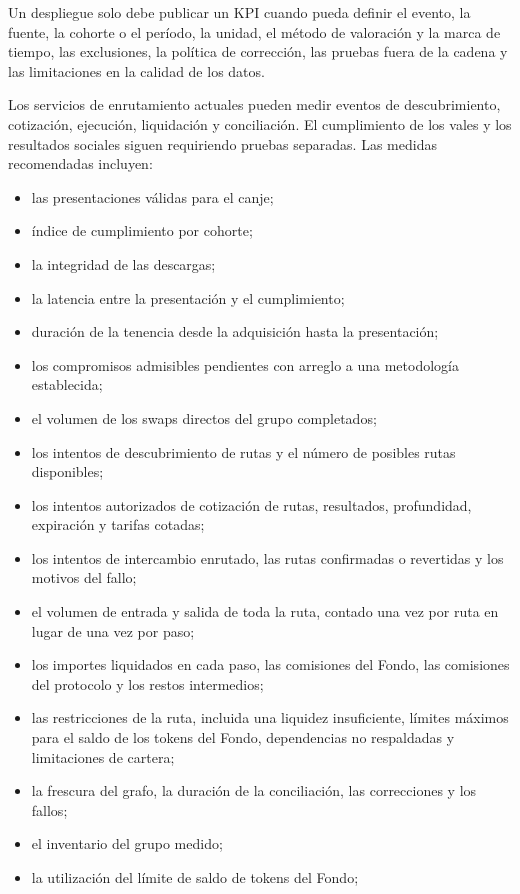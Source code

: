 \documentclass[11pt]{article}
\begin{document}
Un despliegue solo debe publicar un KPI cuando pueda definir el evento, la fuente, la cohorte o el período, la unidad, el método de valoración y la marca de tiempo, las exclusiones, la política de corrección, las pruebas fuera de la cadena y las limitaciones en la calidad de los datos.

Los servicios de enrutamiento actuales pueden medir eventos de descubrimiento, cotización, ejecución, liquidación y conciliación. El cumplimiento de los vales y los resultados sociales siguen requiriendo pruebas separadas. Las medidas recomendadas incluyen:

\begin{itemize}[leftmargin=*]
\item las presentaciones válidas para el canje;
\item índice de cumplimiento por cohorte;
\item la integridad de las descargas;
\item la latencia entre la presentación y el cumplimiento;
\item duración de la tenencia desde la adquisición hasta la presentación;
\item los compromisos admisibles pendientes con arreglo a una metodología establecida;
\item el volumen de los swaps directos del grupo completados;
\item los intentos de descubrimiento de rutas y el número de posibles rutas disponibles;
\item los intentos autorizados de cotización de rutas, resultados, profundidad, expiración y tarifas cotadas;
\item los intentos de intercambio enrutado, las rutas confirmadas o revertidas y los motivos del fallo;
\item el volumen de entrada y salida de toda la ruta, contado una vez por ruta en lugar de una vez por paso;
\item los importes liquidados en cada paso, las comisiones del Fondo, las comisiones del protocolo y los restos intermedios;
\item las restricciones de la ruta, incluida una liquidez insuficiente, límites máximos para el saldo de los tokens del Fondo, dependencias no respaldadas y limitaciones de cartera;
\item la frescura del grafo, la duración de la conciliación, las correcciones y los fallos;
\item el inventario del grupo medido;
\item la utilización del límite de saldo de tokens del Fondo;

\end{itemize}
\end{document}

